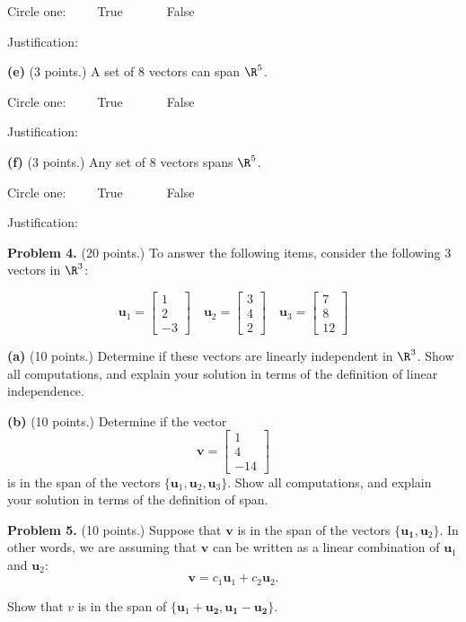 \documentclass[12pt]{article}
\begin{document}
Circle one:\ \ \ \ \  True\ \ \ \ \ \ \ False

Justification:
\vskip2in

\textbf{(e)} (3 points.) A set of 8 vectors can span $\R^5$.

Circle one:\ \ \ \ \  True\ \ \ \ \ \ \ False

Justification:
\vskip2in

\textbf{(f)} (3 points.) Any set of 8 vectors spans $\R^5$.

Circle one:\ \ \ \ \  True\ \ \ \ \ \ \ False

Justification:
\clearpage


\textbf{Problem 4.} (20 points.) To answer the following items, consider the following 3 vectors in $\R^3$:

\[
\textbf{u}_1=\left[\begin{matrix}  1 \\ 2\\ -3\end{matrix}\right]\quad
\textbf{u}_2=\left[\begin{matrix}  3 \\ 4\\ 2\end{matrix}\right]\quad
\textbf{u}_3=\left[\begin{matrix} 7 \\ 8\\ 12\end{matrix}\right]
\]

\textbf{(a)} (10 points.) Determine if these vectors are linearly independent in $\R^3$. Show all computations, and explain your solution in terms of the definition of linear independence.

\clearpage

\textbf{(b)} (10 points.) Determine if the vector
\[
\textbf{v}=\left[\begin{matrix}  1 \\ 4\\ -14\end{matrix}\right]
\]
is in the span of the vectors $\{\mathbf{u}_1,\mathbf{u}_2,\mathbf{u}_3\}$. Show all computations, and explain your solution in terms of the definition of span.

\clearpage

\textbf{Problem 5.} (10 points.) Suppose that $\mathbf{v}$ is in the span of the vectors $\{\mathbf{u_1},\mathbf{u}_2\}$. In other words, we are assuming that $\mathbf{v}$ can be written as a linear combination of $\mathbf{u}_1$ and $\mathbf{u}_2$:
\[
\mathbf{v}=c_1\mathbf{u}_1+c_2\mathbf{u}_2.
\]

Show that $v$ is in the span of $\{\mathbf{u}_1+\mathbf{u_2}, \mathbf{u_1}-\mathbf{u_2}\}$. 



\end{document}
